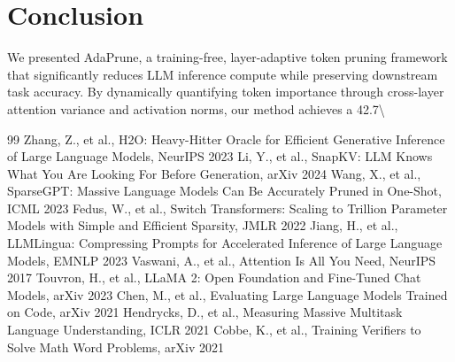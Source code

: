 \documentclass[11pt,a4paper]{article}
\begin{document}
\section{Conclusion}
We presented AdaPrune, a training-free, layer-adaptive token pruning framework that significantly reduces LLM inference compute while preserving downstream task accuracy. By dynamically quantifying token importance through cross-layer attention variance and activation norms, our method achieves a 42.7\textbackslash{}%


\begin{thebibliography}{99}
 Zhang, Z., et al., H2O: Heavy-Hitter Oracle for Efficient Generative Inference of Large Language Models, NeurIPS 2023
 Li, Y., et al., SnapKV: LLM Knows What You Are Looking For Before Generation, arXiv 2024
 Wang, X., et al., SparseGPT: Massive Language Models Can Be Accurately Pruned in One-Shot, ICML 2023
 Fedus, W., et al., Switch Transformers: Scaling to Trillion Parameter Models with Simple and Efficient Sparsity, JMLR 2022
 Jiang, H., et al., LLMLingua: Compressing Prompts for Accelerated Inference of Large Language Models, EMNLP 2023
 Vaswani, A., et al., Attention Is All You Need, NeurIPS 2017
 Touvron, H., et al., LLaMA 2: Open Foundation and Fine-Tuned Chat Models, arXiv 2023
 Chen, M., et al., Evaluating Large Language Models Trained on Code, arXiv 2021
 Hendrycks, D., et al., Measuring Massive Multitask Language Understanding, ICLR 2021
 Cobbe, K., et al., Training Verifiers to Solve Math Word Problems, arXiv 2021
\end{thebibliography}
\end{document}
